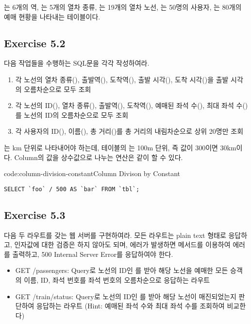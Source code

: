 는 6개의 역, 는 5개의 열차 종류, 는 19개의 열차 노선, 는 50명의 사용자, 는 80개의 예매 현황을 나타내는 테이블이다.

\subsection*{Exercise 5.2}

다음 작업들을 수행하는 SQL문을 각각 작성하여라.

\begin{enumerate}
    \item 각 노선의 열차 종류(), 출발역(), 도착역(), 출발 시각(), 도착 시각()을 출발 시각의 오름차순으로 모두 조회
    \item 각 노선의 ID(), 열차 종류(), 출발역(), 도착역(), 예매된 좌석 수(), 최대 좌석 수()를 노선의 ID의 오름차순으로 모두 조회
    \item 각 사용자의 ID(), 이름(), 총 거리()를 총 거리의 내림차순으로 상위 20명만 조회
\end{enumerate}

는 km 단위로 나타내어야 하는데,  테이블의 는 100m 단위, 즉 값이 300이면 30km이다. Column의 값을 상수값으로 나누는 연산은 \와 같이 할 수 있다.

\begin{codeenv}{code:column-division-constant}{Column Divison by Constant}\begin{verbatim}
SELECT `foo` / 500 AS `bar` FROM `tbl`;
\end{verbatim}
\end{codeenv}

\subsection*{Exercise 5.3}

다음 두 라우트를 갖는 웹 서버를 구현하여라. 모든 라우트는 plain text 형태로 응답하고, 인자값에 대한 검증은 하지 않아도 되며, 에러가 발생하면  메서드를 이용하여 에러를 출력하고, 500 Internal Server Error를 응답하여야 한다.

\begin{itemize}
    \item GET /passengers: Query로 노선의 ID인 를 받아 해당 노선을 예매한 모든 승객의 이름, ID, 좌석 번호를 좌석 번호의 오름차순으로 응답하는 라우트
    \item GET /train/status: Query로 노선의 ID인 를 받아 해당 노선이 매진되었는지 판단하여 응답하는 라우트 (Hint: 예매된 좌석 수와 최대 좌석 수를 조회하여 비교한다)
\end{itemize}
